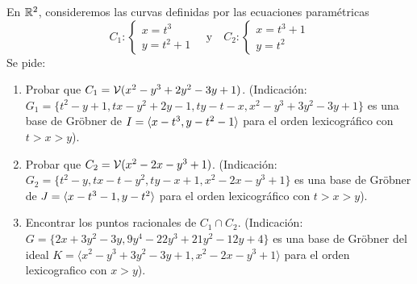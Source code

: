 \documentclass[twoside]{article}
\begin{document}
\newpage

\begin{ejercicio}{2}
En $\mathbb{R}^2$, consideremos las curvas definidas por las ecuaciones paramétricas
\[ C_1: \begin{cases}x=t^3\\y=t^2+1\end{cases} \quad \text{y}\quad C_2: \begin{cases}x = t^3 + 1\\y = t^2\end{cases} \]
Se pide:
\begin{enumerate}
\item Probar que $C_1 = \mathcal{V}(x^2-y^3+2y^2-3y+1)$.
(Indicación: $G_1 = \{t^2-y+1, tx-y^2+2y-1, ty-t-x, x^2-y^3+3y^2-3y+1\}$ es una base de Gröbner de $I = \langle{x-t^3, y-t^2-1}\rangle$ para el orden lexicográfico con $t > x > y$).
\item Probar que $C_2 = \mathcal{V}(x^2-2x-y^3+1)$.
(Indicación: $G_2 = \{t^2-y, tx-t-y^2, ty-x+1, x^2-2x-y^3+1\}$ es una base de Gröbner de $J = \langle{x-t^3-1, y-t^2}\rangle$ para el orden lexicográfico con $t > x > y$).
\item Encontrar los puntos racionales de $C_1 \cap C_2$.
(Indicación: $G = \{2x+3y^2-3y, 9y^4-22y^3 + 21y^2 - 12y + 4\}$ es una base de Gröbner del ideal $K = \langle x^2-y^3+3y^2-3y+1, x^2-2x-y^3+1\rangle$ para el orden lexicografico con $x > y$).
\end{enumerate}
\end{ejercicio}
\end{document}

